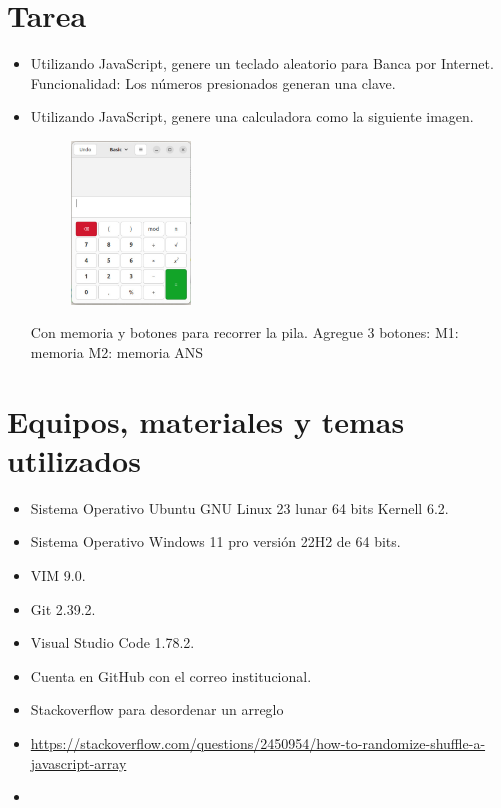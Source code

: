 \documentclass{article}
\begin{document}
	\section{Tarea}
	\begin{itemize}		
		\item Utilizando JavaScript, genere un teclado aleatorio para Banca por Internet.
		Funcionalidad: Los números presionados generan una clave.		
		\item Utilizando JavaScript, genere una calculadora como la siguiente imagen. 
		\begin{figure}[H]
			\centering
			\includegraphics[width=0.3\textwidth,keepaspectratio]{img/calc.png}
		\end{figure}
		Con memoria y botones para recorrer la pila.
		Agregue 3 botones:
		M1: memoria
		M2: memoria
		ANS
	\end{itemize}
		
	\section{Equipos, materiales y temas utilizados}
	\begin{itemize}
		\item Sistema Operativo Ubuntu GNU Linux 23 lunar 64 bits Kernell 6.2.
		\item Sistema Operativo Windows 11 pro versión 22H2 de 64 bits.
		\item VIM 9.0.
		\item Git 2.39.2.
		\item Visual Studio Code 1.78.2.
		\item Cuenta en GitHub con el correo institucional.
		\item Stackoverflow para desordenar un arreglo
		\item \url{https://stackoverflow.com/questions/2450954/how-to-randomize-shuffle-a-javascript-array}
		\item 
	\end{itemize}
	
\end{document}
